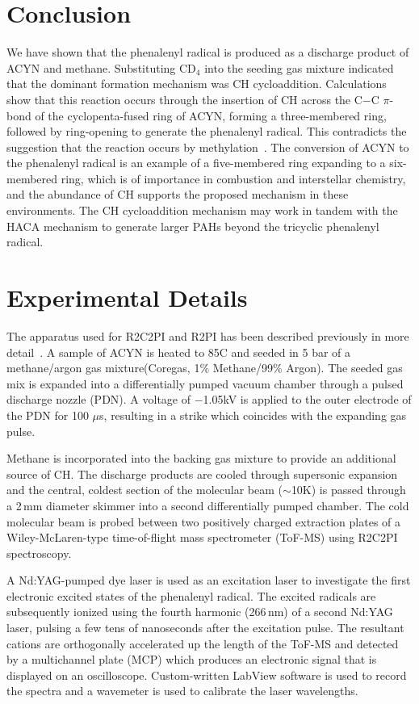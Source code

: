 \documentclass[journal=jacsat,manuscript=article,layout=onecolumn]{achemso}
\begin{document}
\section{Conclusion}

We have shown that the phenalenyl radical is produced as a discharge product of ACYN and methane. Substituting CD$_4$ into the seeding gas mixture indicated that the dominant formation mechanism was CH cycloaddition. Calculations show that this reaction occurs through the insertion of CH across the C$-$C $\pi$-bond of the cyclopenta-fused ring of ACYN, forming a three-membered ring, followed by ring-opening to generate the phenalenyl radical. This contradicts the suggestion that the reaction occurs by methylation~\cite{por20}. The conversion of ACYN to the phenalenyl radical is an example of a five-membered ring expanding to a six-membered ring, which is of importance in combustion and interstellar chemistry, and the abundance of CH supports the proposed mechanism in these environments. The CH cycloaddition mechanism may work in tandem with the HACA mechanism to generate larger PAHs beyond the tricyclic phenalenyl radical.

\section{Experimental Details}

The apparatus used for R2C2PI and R2PI has been described previously in more detail~\cite{rei09}. A sample of ACYN is heated to 85\degree C and seeded in 5 bar of a methane/argon gas mixture(Coregas, 1\% Methane/99\% Argon). The seeded gas mix is expanded into a differentially pumped vacuum chamber through a pulsed discharge nozzle (PDN). A voltage of $-$1.05kV is applied to the outer electrode of the PDN for 100 $\mu$s, resulting in a strike which coincides with the expanding gas pulse.

Methane is incorporated into the backing gas mixture to provide an additional source of CH. The discharge products are cooled through supersonic expansion and the central, coldest section of the molecular beam ($\sim$10K) is passed through a 2\,mm diameter skimmer into a second differentially pumped chamber. The cold molecular beam is probed between two positively charged extraction plates of a Wiley-McLaren-type time-of-flight mass spectrometer (ToF-MS) using R2C2PI spectroscopy.

A Nd:YAG-pumped dye laser is used as an excitation laser to investigate the first electronic excited states of the phenalenyl radical. The excited radicals are subsequently ionized using the fourth harmonic (266\,nm) of a second Nd:YAG laser, pulsing a few tens of nanoseconds after the excitation pulse. The resultant cations are orthogonally accelerated up the length of the ToF-MS and detected by a multichannel plate (MCP) which produces an electronic signal that is displayed on an oscilloscope. Custom-written LabView software is used to record the spectra and a wavemeter is used to calibrate the laser wavelengths.
\end{document}
